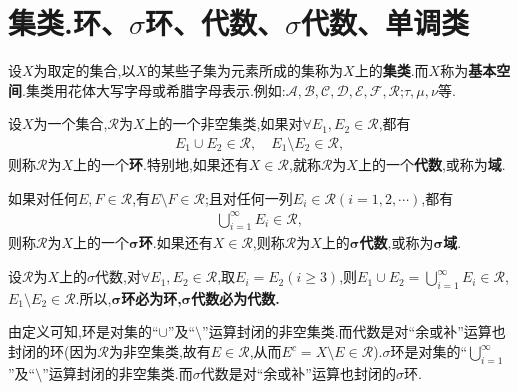 \documentclass[../../main.tex]{subfiles}%
\begin{document}
\section{集类.环、$\sigma$环、代数、$\sigma$代数、单调类}

\begin{definition}
设$X$为取定的集合,以$X$的某些子集为元素所成的集称为$X$上的\textbf{集类}.而$X$称为\textbf{基本空间}.集类用花体大写字母或希腊字母表示.例如:$\mathscr{A},\mathscr{B},\mathscr{C},\mathscr{D},\mathscr{E},\mathscr{F},\mathscr{R}$;$\tau,\mu,\nu$等.
\end{definition}

\begin{definition}
设$X$为一个集合,$\mathscr{R}$为$X$上的一个非空集类,如果对$\forall E_1,E_2 \in \mathscr{R}$,都有
\begin{align*}
E_1 \cup E_2 \in \mathscr{R}, \quad E_1 \setminus E_2 \in \mathscr{R},
\end{align*}
则称$\mathscr{R}$为$X$上的一个\textbf{环}.特别地,如果还有$X \in \mathscr{R}$,就称$\mathscr{R}$为$X$上的一个\textbf{代数},或称为\textbf{域}.

如果对任何$E,F \in \mathscr{R}$,有$E \setminus F \in \mathscr{R}$;且对任何一列$E_i \in \mathscr{R}(i=1,2,\cdots)$,都有
\begin{align*}
\bigcup_{i=1}^{\infty} E_i \in \mathscr{R},
\end{align*}
则称$\mathscr{R}$为$X$上的一个$\boldsymbol{\sigma }$\textbf{环}.如果还有$X \in \mathscr{R}$,则称$\mathscr{R}$为$X$上的$\boldsymbol{\sigma }$\textbf{代数},或称为$\boldsymbol{\sigma }$\textbf{域}.
\end{definition}
\begin{remark}
设$\mathscr{R}$为$X$上的$\sigma$代数,对$\forall E_1,E_2 \in \mathscr{R}$,取$E_i = E_2(i \geqslant 3)$,则$E_1 \cup E_2 = \bigcup_{i=1}^{\infty} E_i \in \mathscr{R}$,$E_1 \setminus E_2 \in \mathscr{R}$.所以,\textbf{$\boldsymbol{\sigma}$环必为环,$\boldsymbol{\sigma}$代数必为代数.}

由定义可知,环是对集的“$\cup$”及“$\setminus$”运算封闭的非空集类.而代数是对“余或补”运算也封闭的环(因为$\mathscr{R}$为非空集类,故有$E \in \mathscr{R}$,从而$E^c = X \setminus E \in \mathscr{R}$).$\sigma$环是对集的“$\bigcup_{i=1}^{\infty}$”及“$\setminus$”运算封闭的非空集类.而$\sigma$代数是对“余或补”运算也封闭的$\sigma$环.
\end{remark}
\end{document}
